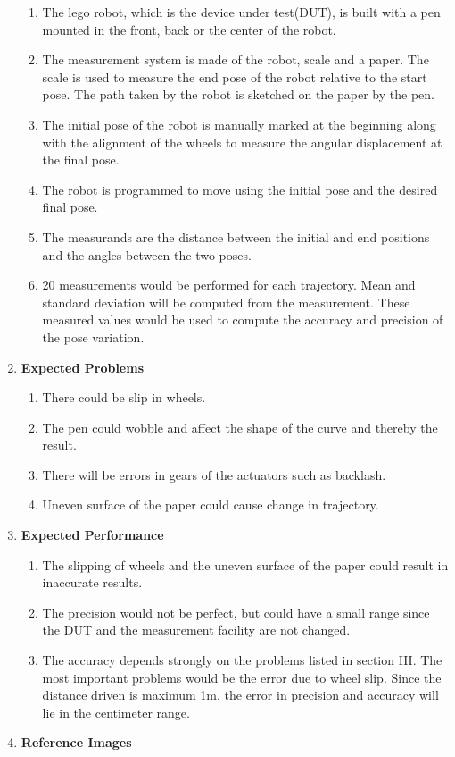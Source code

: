 \documentclass[10pt,a4paper]{article}
\begin{document}
\begin{enumerate}[label=\Roman*]
\begin{enumerate}
	\item
	The lego robot, which is the device under test(DUT), is built with a pen mounted in the front, back or the center of the robot.
	\item
	The measurement system is made of the robot, scale and a paper. The scale is used to measure the end pose of the robot relative to the start pose. The path taken by the robot is sketched on the paper by the pen.
	\item
	The initial pose of the robot is manually marked at the beginning along with the alignment of the wheels to measure the angular displacement at the final pose.
	\item
	The robot is programmed to move using the initial pose and the desired final pose.
	\item
	The measurands are the distance between the initial and end positions and the angles between the two poses.
	\item
	20 measurements would be performed for each trajectory. Mean and standard deviation will be computed from the measurement. These measured values would be used to compute the accuracy and precision of the pose variation. 
\end{enumerate}
\vspace{0.5cm}
\item
\textbf{Expected Problems}\\
\begin{enumerate}
	\item
	There could be slip in wheels.
	\item
	The pen could wobble and affect the shape of the curve and thereby the result.
	\item
	There will be errors in gears of the actuators such as backlash.
	\item
	Uneven surface of the paper could cause change in trajectory.
\end{enumerate}
\newpage	
\item
\textbf{Expected Performance}\\
\begin{enumerate}
	\item
	The slipping of wheels and the uneven surface of the paper could result in inaccurate results.
	\item
	The precision would not be perfect, but could have a small range since the DUT and the measurement facility are not changed.
	\item
	The accuracy depends strongly on the problems listed in section III. The most important problems would be the error due to wheel slip. Since the distance driven is maximum 1m, the error in precision and accuracy will lie in the centimeter range.
\end{enumerate}
\item
\textbf{Reference Images}\\


\end{enumerate}
\end{document}
